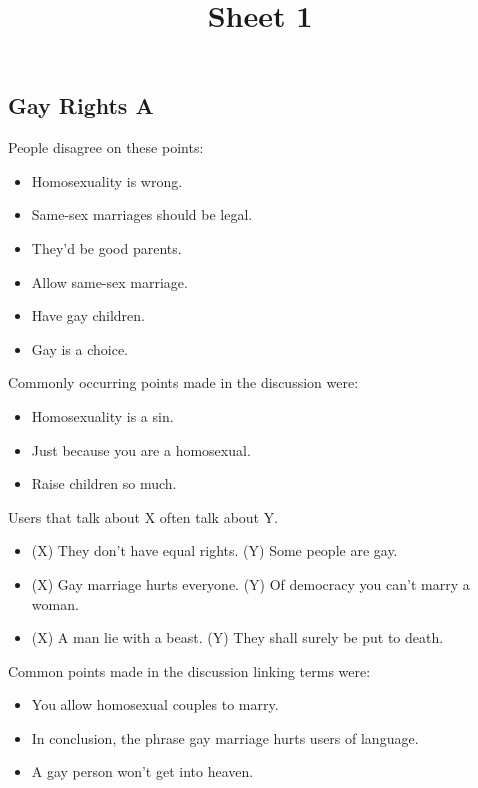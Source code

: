 \documentclass[tikz]{article}
\title{\textbf{Sheet 1}\vspace{-9ex}}
\date{}
\begin{document}
  \maketitle

  \begin{multicols}{2}
    \subsection*{Gay Rights A}
    People disagree on these points:
    \begin{itemize}[noitemsep,nolistsep,label={}]
      \item{Homosexuality is wrong.}
      \item{Same-sex marriages should be legal.}
      \item{They'd be good parents.}
      \item{Allow same-sex marriage.}
      \item{Have gay children.}
      \item{Gay is a choice.}
    \end{itemize}

    Commonly occurring points made in the discussion were:
    \begin{itemize}[noitemsep,nolistsep,label={}]
      \item{Homosexuality is a sin.}
      \item{Just because you are a homosexual.}
      \item{Raise children so much.}
    \end{itemize}

    Users that talk about X often talk about Y.
    \begin{itemize}[noitemsep,nolistsep,label={}]
      \item{(X) They don't have equal rights. (Y) Some people are gay.}
      \item{(X) Gay marriage hurts everyone. (Y) Of democracy you can't marry a woman.}
      \item{(X) A man lie with a beast. (Y) They shall surely be put to death.}
    \end{itemize}

    Common points made in the discussion linking terms were:
    \begin{itemize}[noitemsep,nolistsep,label={}]
      \item{You allow homosexual couples to marry.}
      \item{In conclusion, the phrase gay marriage hurts users of language.}
      \item{A gay person won't get into heaven.}
    \end{itemize}


\end{multicols}
\end{document}
